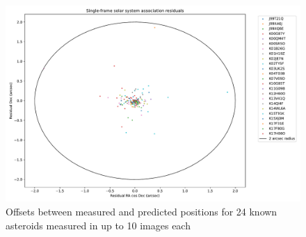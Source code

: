 \begin{figure}
\includegraphics[width=5.5in]{sfa_resid-2.pdf}
\caption{Offsets between measured and predicted positions for 24 known asteroids measured in up to 10 images each \label{fig:resid01}}
\end{figure}





